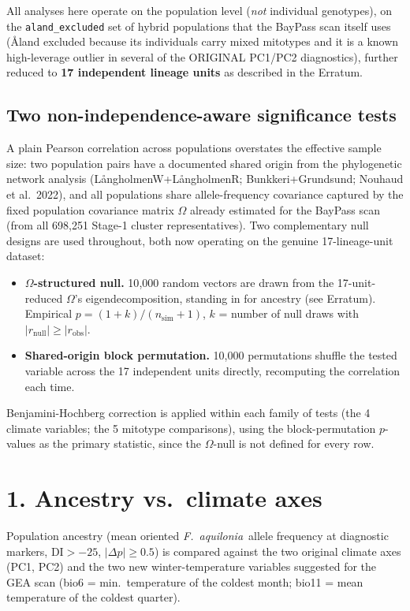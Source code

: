 \documentclass[11pt]{article}
\newcommand{\Faq}{\textit{F.~aquilonia}}
\begin{document}
All analyses here operate on the population level (\emph{not} individual genotypes), on the
\texttt{aland\_excluded} set of hybrid populations that the BayPass scan itself uses
(\AA land excluded because its individuals carry mixed mitotypes and it is a known
high-leverage outlier in several of the ORIGINAL PC1/PC2 diagnostics), further reduced to
\textbf{17 independent lineage units} as described in the Erratum.

\subsection*{\color{Muted}Two non-independence-aware significance tests}
A plain Pearson correlation across populations overstates the effective sample size: two
population pairs have a documented shared origin from the phylogenetic network analysis
(L{\aa}ngholmenW+L{\aa}ngholmenR; Bunkkeri+Grundsund; Nouhaud et al.\ 2022), and all
populations share allele-frequency covariance captured by the fixed population covariance
matrix $\Omega$ already estimated for the BayPass scan (from all 698{,}251 Stage-1 cluster
representatives). Two complementary null designs are used throughout, both now operating on
the genuine 17-lineage-unit dataset:
\begin{itemize}
  \item \textbf{$\Omega$-structured null.} 10{,}000 random vectors are drawn from the
    17-unit-reduced $\Omega$'s eigendecomposition, standing in for ancestry (see Erratum).
    Empirical $p = (1+k)/(n_{\mathrm{sim}}+1)$, $k$ = number of null draws with
    $|r_{\mathrm{null}}| \geq |r_{\mathrm{obs}}|$.
  \item \textbf{Shared-origin block permutation.} 10{,}000 permutations shuffle the tested
    variable across the 17 independent units directly, recomputing the correlation each
    time.
\end{itemize}
Benjamini-Hochberg correction is applied within each family of tests (the 4 climate
variables; the 5 mitotype comparisons), using the block-permutation $p$-values as the
primary statistic, since the $\Omega$-null is not defined for every row.

\clearpage
\section*{\color{Accent}1. Ancestry vs.\ climate axes}

Population ancestry (mean oriented \Faq\ allele frequency at diagnostic markers,
DI$>-25$, $|\Delta p|\geq0.5$) is compared against the two original climate axes (PC1, PC2)
and the two new winter-temperature variables suggested for the GEA scan
(bio6 = min.\ temperature of the coldest month; bio11 = mean temperature of the coldest
quarter).
\end{document}
